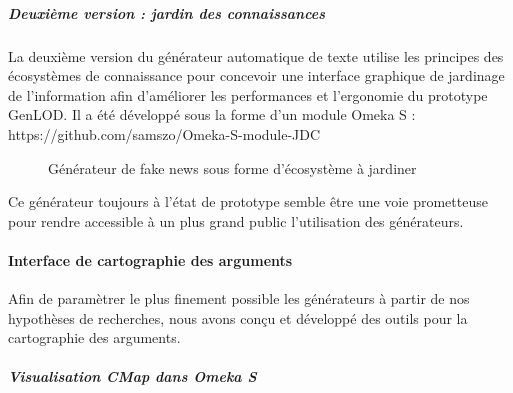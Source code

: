 \documentclass[
  a4paper,
  DIV=11,
  numbers=noendperiod]{scrreprt}
\let\oldparagraph\paragraph
\renewcommand{\paragraph}[1]{\oldparagraph{#1}\mbox{}}
\let\oldsubparagraph\subparagraph
\renewcommand{\subparagraph}[1]{\oldsubparagraph{#1}\mbox{}}
\begin{document}
\subparagraph{Deuxième version : jardin des
connaissances}\label{deuxiuxe8me-version-jardin-des-connaissances}

La deuxième version du générateur automatique de texte utilise les
principes des écosystèmes de connaissance pour concevoir une interface
graphique de jardinage de l'information afin d'améliorer les
performances et l'ergonomie du prototype GenLOD. Il a été développé sous
la forme d'un module Omeka S :
https://github.com/samszo/Omeka-S-module-JDC

\begin{figure}


\caption{\label{fig-GenJDC}Générateur de fake news sous forme
d'écosystème à jardiner}

\end{figure}%

Ce générateur toujours à l'état de prototype semble être une voie
prometteuse pour rendre accessible à un plus grand public l'utilisation
des générateurs.

\paragraph{Interface de cartographie des
arguments}\label{interface-de-cartographie-des-arguments}

Afin de paramètrer le plus finement possible les générateurs à partir de
nos hypothèses de recherches, nous avons conçu et développé des outils
pour la cartographie des arguments.

\subparagraph{Visualisation CMap dans Omeka
S}\label{visualisation-cmap-dans-omeka-s}
\end{document}
